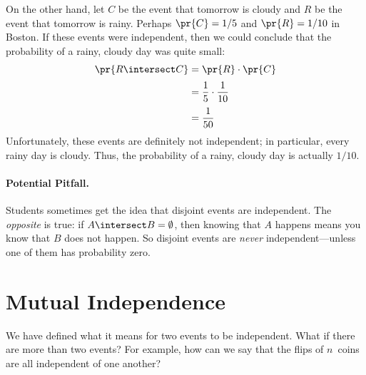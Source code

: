 On the other hand, let $C$ be the event that tomorrow is cloudy and
$R$ be the event that tomorrow is rainy.  Perhaps $\pr{C} = 1/5$ and
$\pr{R} = 1/10$ in Boston.  If these events were independent, then we
could conclude that the probability of a rainy, cloudy day was quite
small:
%
\begin{align*}
\pr{R \intersect C} & = \pr{R} \cdot \pr{C} \\[2pt]
              & = \frac{1}{5} \cdot \frac{1}{10} \\[2pt]
              & = \frac{1}{50}
\end{align*}
%
Unfortunately, these events are definitely not independent; in
particular, every rainy day is cloudy.  Thus, the probability of a
rainy, cloudy day is actually $1/10$.


\paragraph{Potential Pitfall.}

Students sometimes get the idea that disjoint events are independent.
The \emph{opposite} is true: if $A \intersect B = \emptyset$, then
knowing that $A$ happens means you know that $B$ does not happen.  So
disjoint events are \emph{never} independent---unless one of them has
probability zero.


\section{Mutual Independence}

We have defined what it means for two events to be independent.  What
if there are more than two events?  For example, how can we say that
the flips of $n$~coins are all independent of one another?

